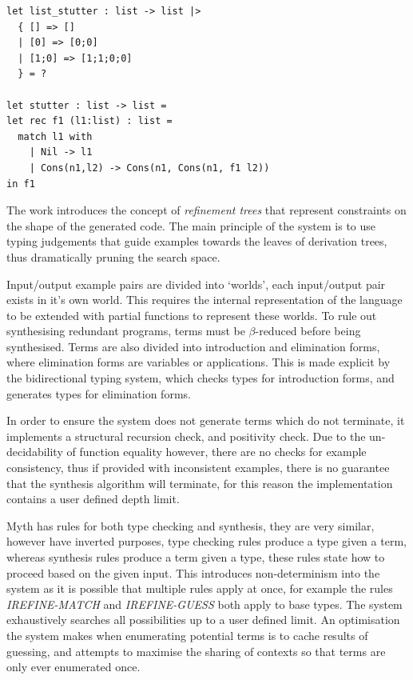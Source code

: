 \documentclass[a4paper]{article}
\begin{document}
\begin{center}
\begin{verbatim}
let list_stutter : list -> list |>
  { [] => []
  | [0] => [0;0]
  | [1;0] => [1;1;0;0]
  } = ?

let stutter : list -> list =
let rec f1 (l1:list) : list =
  match l1 with 
	| Nil -> l1
	| Cons(n1,l2) -> Cons(n1, Cons(n1, f1 l2))
in f1
\end{verbatim}
\end{center}

The work introduces the concept of \emph{refinement trees} that represent constraints on the shape of the generated code. 
The main principle of the system is to use typing judgements that guide examples towards the leaves of derivation trees,
thus dramatically pruning the search space.  

Input/output example pairs are divided into `worlds', each input/output pair exists in it's own world. This requires the internal representation 
of the language to be extended with partial functions to represent these worlds. 
To rule out synthesising redundant programs, terms must be \(\beta\)-reduced before being synthesised. Terms are also divided into introduction 
and elimination forms, where elimination forms are variables or applications. This is made explicit by the bidirectional typing system, 
which checks types for introduction forms, and generates types for elimination forms.

In order to ensure the system does not generate terms which do not terminate, it implements a structural recursion check, and positivity check.
Due to the un-decidability of function equality however, there are no checks for example consistency, thus if provided with inconsistent examples, there
is no guarantee that the synthesis algorithm will terminate, for this reason the implementation contains a user defined depth limit. 

Myth has rules for both type checking and synthesis, they are very similar, however have inverted purposes, type checking rules produce a 
type given a term, whereas synthesis rules produce a term given a type, these rules state how to proceed based on the given input. This introduces
non-determinism into the system as it is possible that multiple rules apply at once, for example the rules \emph{IREFINE-MATCH} and \emph{IREFINE-GUESS} both 
apply to base types. The system exhaustively searches all possibilities up to a user defined limit. An optimisation the system makes when enumerating potential 
terms is to cache results of guessing, and attempts to maximise the sharing of contexts so that terms are only ever enumerated once. 
\end{document}
